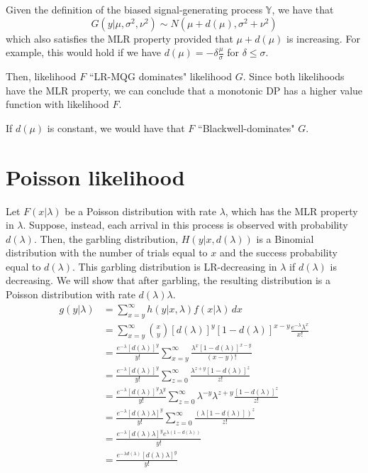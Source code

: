 \documentclass[11pt,onecolumn]{article}
\theoremstyle{plain}
\newcommand{\iY}[0]{{\mathbb{Y}}}
\begin{document}
Given the definition of the biased signal-generating process $\iY$, we have that
\begin{equation}
    G(y|\mu, \sigma^2, \nu^2)\sim N(\mu+d(\mu), \sigma^2+\nu^2)
\end{equation}
which also satisfies the MLR property provided that $\mu+d(\mu)$ is increasing. For example, this would hold if we have $d(\mu)=-\delta\frac{\mu}{\sigma}$ for $\delta\leq \sigma$.

Then, likelihood $F$ ``LR-MQG dominates" likelihood $G$. Since  both likelihoods have the MLR property, we can conclude that a monotonic DP has a higher value function with likelihood $F$.

If $d(\mu)$ is constant, we would have that  $F$ ``Blackwell-dominates"  $G$.


\section{Poisson likelihood}

Let $F(x|\lambda)$ be a Poisson distribution with rate $\lambda$, which has the MLR property in $\lambda$. Suppose, instead, each arrival in this process is observed with probability $d(\lambda)$. Then, the garbling distribution, $H(y|x, d(\lambda))$ is a Binomial distribution with the number of trials equal to $x$ and the success probability equal to $d(\lambda)$. This garbling distribution is LR-decreasing in $\lambda$ if $d(\lambda)$ is decreasing. We will show that after garbling, the resulting distribution is a Poisson distribution with rate $d(\lambda)\lambda$.
\begin{align}
    g(y|\lambda)&=\sum_{x=y}^\infty h(y|x, \lambda) f(x|\lambda)\, dx\\
    &=\sum_{x=y}^\infty{x \choose y} [d(\lambda)]^y [1-d(\lambda)]^{x-y}\frac{e^{-\lambda}\lambda^x}{x!}\\
    &=\frac{e^{-\lambda}[d(\lambda)]^y}{y!}\sum_{x=y}^\infty \frac{\lambda^x[1-d(\lambda)]^{x-y}}{(x-y)!}\\
    &=\frac{e^{-\lambda}[d(\lambda)]^y}{y!}\sum_{z=0}^\infty \frac{\lambda^{z+y}[1-d(\lambda)]^{z}}{z!}\\
    &=\frac{e^{-\lambda}[d(\lambda)]^y\lambda^y}{y!}\sum_{z=0}^\infty \lambda^{-y}\lambda^{z+y}\frac{[1-d(\lambda)]^{z}}{z!} \\
    &=\frac{e^{-\lambda}[d(\lambda)\lambda]^y}{y!}\sum_{z=0}^\infty \frac{\left(\lambda[1-d(\lambda)]\right)^{z}}{z!} \\
    &=\frac{e^{-\lambda}[d(\lambda)\lambda]^ye^{\lambda(1-d(\lambda))}}{y!} \\
     &=\frac{e^{-\lambda d(\lambda)}[d(\lambda)\lambda]^y}{y!}
\end{align}
\end{document}
